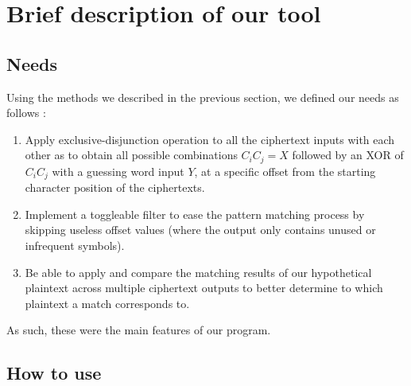 \documentclass[a4paper,11pt]{article}
\begin{document}
\newpage

\section{Brief description of our tool}

\subsection{Needs}

Using the methods we described in the previous section, we defined our needs as follows :

\begin{enumerate}
\item Apply exclusive-disjunction operation to all the ciphertext inputs with each other as to obtain all possible combinations $C_{i}C_{j} = X$ followed by an XOR of $C_{i}C_{j}$ with a guessing word input $Y$, at a specific offset from the starting character position of the ciphertexts.
\item Implement a toggleable filter to ease the pattern matching process by skipping useless offset values (where the output only contains unused or infrequent symbols).
\item Be able to apply and compare the matching results of our hypothetical plaintext across multiple ciphertext outputs to better determine to which plaintext a match corresponds to.
\end{enumerate}

\noindent
As such, these were the main features of our program.

\subsection{How to use}
\end{document}
